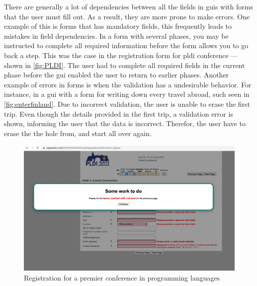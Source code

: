 There are generally a lot of dependencies between all the fields in \gls{gui}s with forms that the user must fill out. As a result, they are more prone to make errors. One example of this is forms that has mandatory fields, this frequently leads to mistakes in field dependencies. In a form with several phases, you may be instructed to complete all required information before the form allows you to go back a step. This was the case in the registration form for \gls{pldi} conference --- shown in \autoref{fig:PLDI}. The user had to complete all required fields in the current phase before the \gls{gui} enabled the user to return to earlier phases. 
Another example of errors in forms is when the validation has a undesirable behavior. For instance, in a \gls{gui} with a form for writing down every travel abroad, such seen in \autoref{fig:enterfinland}. Due to incorrect validation, the user is unable to erase the first trip. Even though the details provided in the first trip, a validation error is shown, informing the user that the data is incorrect. Therefor, the user have to erase the the hole from, and start all over again.
\begin{figure}
    \centering
    \includegraphics[scale=0.2]{figures/PLDI.jpg}
    \caption{Registration for a premier conference in programming languages}
    \label{fig:PLDI}
\end{figure}


